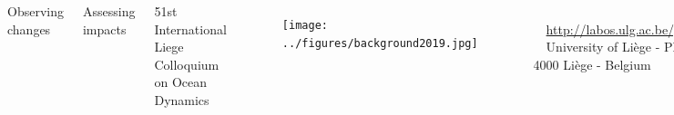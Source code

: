 \documentclass[final,table,14pt,svgnames]{beamer}
\begin{document}
\begin{frame}[fragile, t]
\begin{columns}
\vspace{.25cm}

\begin{tcolorbox}
Observing changes
\end{tcolorbox}

\vspace{.25cm}

\begin{tcolorbox}
Assessing impacts
\end{tcolorbox}

\column{0.5\paperwidth}
\centering

\vspace*{.3cm}
\footnotesize 51st International Liege Colloquium on Ocean Dynamics
\vspace*{.3cm}

\begin{figure}
\texttt{[image: ../figures/background2019.jpg]}
\end{figure}

{\scriptsize
\textcolor{greygher}{{\faCalendarCheckO}~~\insertdate}\\
\textcolor{bluegher}{{\faHome}~~\url{http://labos.ulg.ac.be/gher/home/colloquium/}}\\
\textcolor{greygher}{{\faMapPin}~~University of Liège - Place du 20-Août, 7 - 4000 Liège - Belgium}\\
}


\column{0.22\paperwidth}
\centering
\scriptsize


\begin{tcolorbox}
Cryosphere-oceans\\ interaction
\end{tcolorbox}

\vspace{.25cm}

\begin{tcolorbox}
Paleo-oceanographic changes
\end{tcolorbox}

\vspace{.25cm}

\begin{tcolorbox}
Future changes
\end{tcolorbox}
   
\column{0.025\paperwidth}


\end{columns}




\end{frame}
\end{document}

